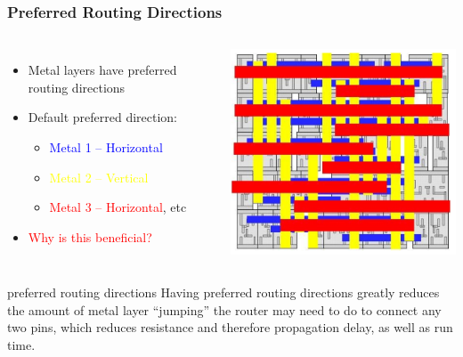 \documentclass[compress]{beamer}
\begin{document}
\begin{frame}
	\frametitle{Preferred Routing Directions}
	\begin{columns}	
		\begin{itemize}
			\item Metal layers have preferred
			routing directions
			\item Default preferred direction:
				\begin{itemize}
					\item \textcolor{blue}{Metal 1 – Horizontal}
					\item \textcolor{yellow}{Metal 2 – Vertical}
					\item \textcolor{red}{Metal 3 – Horizontal}, etc
				\end{itemize}
			\item \textcolor{red}{Why is this beneficial?}
		\end{itemize}
		\begin{center}
			\includegraphics[width=0.7 \textwidth]{routing}
		\end{center}
	\end{columns}
	\pause
	\begin{block}{preferred routing directions}
		Having preferred routing directions greatly reduces the amount of metal layer “jumping” the router
		may need to do to connect any two pins, which reduces resistance and therefore propagation delay,
		as well as run time.
	\end{block}
\end{frame}
\end{document}
